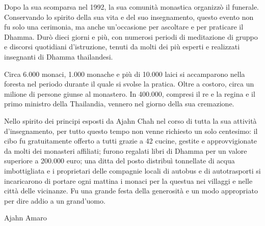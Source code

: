 Dopo la sua scomparsa nel 1992, la sua comunità monastica organizzò il
funerale. Conservando lo spirito della sua vita e del suo insegnamento,
questo evento non fu solo una cerimonia, ma anche un'occasione per
ascoltare e per praticare il Dhamma. Durò dieci giorni e più, con
numerosi periodi di meditazione di gruppo e discorsi quotidiani
d'istruzione, tenuti da molti dei più esperti e realizzati insegnanti di
Dhamma thailandesi.

Circa 6.000 monaci, 1.000 monache e più di 10.000 laici si accamparono
nella foresta nel periodo durante il quale si svolse la pratica. Oltre a
costoro, circa un milione di persone giunse al monastero. In 400.000,
compresi il re e la regina e il primo ministro della Thailandia, vennero
nel giorno della sua cremazione.

Nello spirito dei principi esposti da Ajahn Chah nel corso di tutta la
sua attività d'insegnamento, per tutto questo tempo non venne richiesto
un solo centesimo: il cibo fu gratuitamente offerto a tutti grazie a 42
cucine, gestite e approvvigionate da molti dei monasteri affiliati;
furono regalati libri di Dhamma per un valore superiore a 200.000 euro;
una ditta del posto distribuì tonnellate di acqua imbottigliata e i
proprietari delle compagnie locali di autobus e di autotrasporti si
incaricarono di portare ogni mattina i monaci per la questua nei
villaggi e nelle città delle vicinanze. Fu una grande festa della
generosità e un modo appropriato per dire addio a un grand'uomo.

Ajahn Amaro

